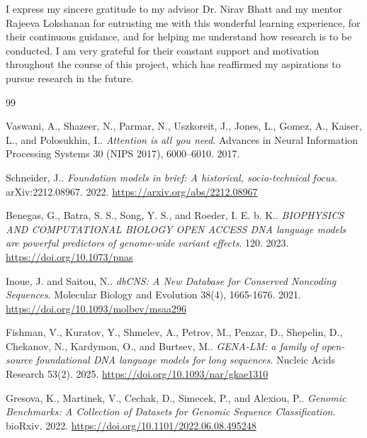 \documentclass{ifacconf}
\begin{document}
\begin{ack}
I express my sincere gratitude to my advisor Dr. Nirav Bhatt and my mentor Rajeeva Lokshanan for entrusting me with this wonderful learning experience, for their continuous guidance, and for helping me understand how research is to be conducted. I am very grateful for their constant support and motivation throughout the course of this project, which has reaffirmed my aspirations to pursue research in the future.
\end{ack}

%
\begin{thebibliography}{99}

Vaswani, A., Shazeer, N., Parmar, N., Uszkoreit, J., Jones, L., Gomez, A., Kaiser, L., and Polosukhin, I..
\textit{Attention is all you need}.
Advances in Neural Information Processing Systems 30 (NIPS 2017), 6000--6010. 2017.

Schneider, J..
\textit{Foundation models in brief: A historical, socio-technical focus}.
arXiv:2212.08967. 2022.
\url{https://arxiv.org/abs/2212.08967}

Benegas, G., Batra, S. S., Song, Y. S., and Roeder, I. E. b. K..
\textit{BIOPHYSICS AND COMPUTATIONAL BIOLOGY OPEN ACCESS DNA language models are powerful predictors of genome-wide variant effects}.
 120. 2023.
\url{https://doi.org/10.1073/pnas}

Inoue, J. and Saitou, N..
\textit{dbCNS: A New Database for Conserved Noncoding Sequences}.
Molecular Biology and Evolution 38(4), 1665-1676. 2021.
\url{https://doi.org/10.1093/molbev/msaa296}

Fishman, V., Kuratov, Y., Shmelev, A., Petrov, M., Penzar, D., Shepelin, D., Chekanov, N., Kardymon, O., and Burtsev, M..
\textit{GENA-LM: a family of open-source foundational DNA language models for long sequences}.
Nucleic Acids Research 53(2). 2025.
\url{https://doi.org/10.1093/nar/gkae1310}

Gresova, K., Martinek, V., Cechak, D., Simecek, P., and Alexiou, P..
\textit{Genomic Benchmarks: A Collection of Datasets for Genomic Sequence Classification}.
bioRxiv. 2022.
\url{https://doi.org/10.1101/2022.06.08.495248}


\end{thebibliography}
\end{document}
